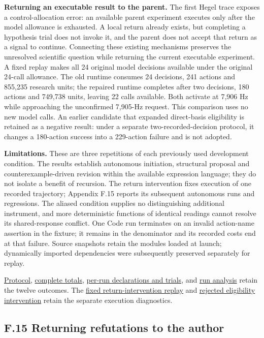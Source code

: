 \documentclass[11pt,a4paper]{article}
\begin{document}
\textbf{Returning an executable result to the parent.} The first Hegel trace exposes a control-allocation error: an available parent experiment executes only after the model allowance is exhausted. A local return already exists, but completing a hypothesis trial does not invoke it, and the parent does not accept that return as a signal to continue. Connecting these existing mechanisms preserves the unresolved scientific question while returning the current executable experiment. A fixed replay makes all 24 original model decisions available under the original 24-call allowance. The old runtime consumes 24 decisions, 241 actions and 855,235 research units; the repaired runtime completes after two decisions, 180 actions and 749,738 units, leaving 22 calls available. Both activate at 7,906 Hz while approaching the unconfirmed 7,905-Hz request. This comparison uses no new model calls. An earlier candidate that expanded direct-basis eligibility is retained as a negative result: under a separate two-recorded-decision protocol, it changes a 180-action success into a 229-action failure and is not adopted.


\textbf{Limitations.} These are three repetitions of each previously used development condition. The results establish autonomous initiation, structural proposal and counterexample-driven revision within the available expression language; they do not isolate a benefit of recursion. The return intervention fixes execution of one recorded trajectory; Appendix F.15 reports its subsequent autonomous runs and regressions. The aliased condition supplies no distinguishing additional instrument, and more deterministic functions of identical readings cannot resolve its shared-response conflict. One Code run terminates on an invalid action-name assertion in the fixture; it remains in the denominator and its recorded costs end at that failure. Source snapshots retain the modules loaded at launch; dynamically imported dependencies were subsequently preserved separately for replay.


\hyperlink{artifact-111}{Protocol}, \hyperlink{artifact-112}{complete totals}, \hyperlink{artifact-113}{per-run declarations and trials}, and \hyperlink{artifact-114}{run analysis} retain the twelve outcomes. The \hyperlink{artifact-115}{fixed return-intervention replay} and \hyperlink{artifact-116}{rejected eligibility intervention} retain the separate execution diagnostics.


\subsection*{F.15 Returning refutations to the author}
\end{document}
